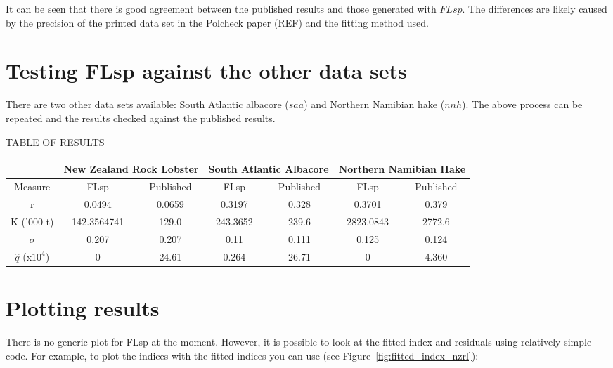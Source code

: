 \documentclass[a4paper]{article}
\begin{document}
It can be seen that there is good agreement between the published results and those generated with $FLsp$. The differences are likely caused by the precision of the printed data set in the Polcheck paper (REF) and the fitting method used.

\section{Testing FLsp against the other data sets}

There are two other data sets available: South Atlantic albacore ($saa$) and Northern Namibian hake ($nnh$). The above process can be repeated and the results checked against the published results.


TABLE OF RESULTS

\begin{tabular}{|c|c|c|c|c|c|c|}
\hline
& \multicolumn{2}{|c|}{New Zealand Rock Lobster}
& \multicolumn{2}{|c|}{South Atlantic Albacore}
& \multicolumn{2}{|c|}{Northern Namibian Hake} \\
\hline
Measure & FLsp & Published & FLsp & Published & FLsp & Published \\
\hline
r          & 0.0494 & 0.0659 &  0.3197 &  0.328 & 0.3701 & 0.379\\
K ('000 t) & 142.3564741& 129.0  &  243.3652 & 239.6  & 2823.0843 & 2772.6\\
$\sigma$   & 0.207 & 0.207  &  0.11 & 0.111 & 0.125& 0.124\\
$\hat{q}$ (x$10^4$)  &0 & 24.61&  0.264 & 26.71 &0& 4.360 \\
\hline
\end{tabular}

\section{Plotting results}
There is no generic plot for FLsp at the moment. However, it is possible to look at the fitted index and residuals using relatively simple code. For example, to plot the indices with the fitted indices you can use (see Figure~\ref{fig:fitted_index_nzrl}):
\end{document}
